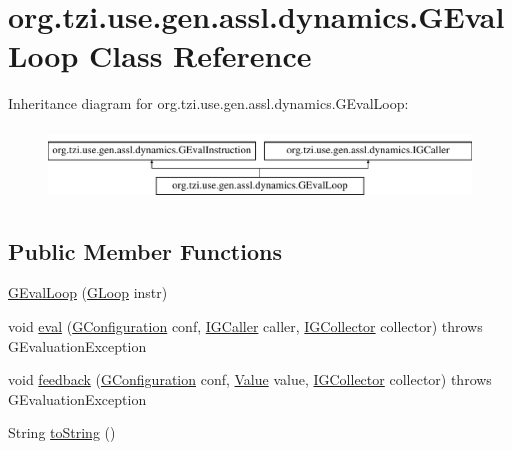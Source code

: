 \hypertarget{classorg_1_1tzi_1_1use_1_1gen_1_1assl_1_1dynamics_1_1_g_eval_loop}{\section{org.\-tzi.\-use.\-gen.\-assl.\-dynamics.\-G\-Eval\-Loop Class Reference}
\label{classorg_1_1tzi_1_1use_1_1gen_1_1assl_1_1dynamics_1_1_g_eval_loop}
}
Inheritance diagram for org.\-tzi.\-use.\-gen.\-assl.\-dynamics.\-G\-Eval\-Loop\-:\begin{figure}[H]
\begin{center}
\leavevmode
\includegraphics[height=1.978799cm]{classorg_1_1tzi_1_1use_1_1gen_1_1assl_1_1dynamics_1_1_g_eval_loop}
\end{center}
\end{figure}
\subsection*{Public Member Functions}
\begin{DoxyCompactItemize}
\item 
\hyperlink{classorg_1_1tzi_1_1use_1_1gen_1_1assl_1_1dynamics_1_1_g_eval_loop_a4bf39dabd21fbbf247a287a407dfc527}{G\-Eval\-Loop} (\hyperlink{classorg_1_1tzi_1_1use_1_1gen_1_1assl_1_1statics_1_1_g_loop}{G\-Loop} instr)
\item 
void \hyperlink{classorg_1_1tzi_1_1use_1_1gen_1_1assl_1_1dynamics_1_1_g_eval_loop_a72ea05bcccab8960bf5d56af60d1c4a7}{eval} (\hyperlink{classorg_1_1tzi_1_1use_1_1gen_1_1assl_1_1dynamics_1_1_g_configuration}{G\-Configuration} conf, \hyperlink{interfaceorg_1_1tzi_1_1use_1_1gen_1_1assl_1_1dynamics_1_1_i_g_caller}{I\-G\-Caller} caller, \hyperlink{interfaceorg_1_1tzi_1_1use_1_1gen_1_1assl_1_1dynamics_1_1_i_g_collector}{I\-G\-Collector} collector)  throws G\-Evaluation\-Exception 
\item 
void \hyperlink{classorg_1_1tzi_1_1use_1_1gen_1_1assl_1_1dynamics_1_1_g_eval_loop_a548378f372308aeff5cdc439db3931a9}{feedback} (\hyperlink{classorg_1_1tzi_1_1use_1_1gen_1_1assl_1_1dynamics_1_1_g_configuration}{G\-Configuration} conf, \hyperlink{classorg_1_1tzi_1_1use_1_1uml_1_1ocl_1_1value_1_1_value}{Value} value, \hyperlink{interfaceorg_1_1tzi_1_1use_1_1gen_1_1assl_1_1dynamics_1_1_i_g_collector}{I\-G\-Collector} collector)  throws G\-Evaluation\-Exception 
\item 
String \hyperlink{classorg_1_1tzi_1_1use_1_1gen_1_1assl_1_1dynamics_1_1_g_eval_loop_ae093cd2d5ee7963cec8ad1185279bc24}{to\-String} ()
\end{DoxyCompactItemize}
